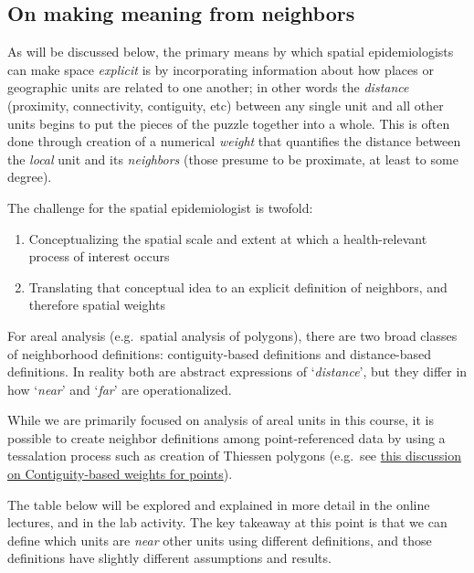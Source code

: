 \documentclass[
]{book}
\providecommand{\tightlist}{%
  \setlength{\itemsep}{0pt}\setlength{\parskip}{0pt}}
\newenvironment{rmdcaution}[1]
  {
  \begin{itemize}
  \renewcommand{\labelitemi}{
    \raisebox{-.7\height}[0pt][0pt]{
      {\setkeys{Gin}{width=3em,keepaspectratio}\texttt{[image: images/\#1]}}
    }
  }
  \setlength{\fboxsep}{1em}
  \begin{caution}
  \item
  }
  {
  \end{caution}
  \end{itemize}
  }
\begin{document}
\hypertarget{on-making-meaning-from-neighbors}{%
\subsection{On making meaning from neighbors}\label{on-making-meaning-from-neighbors}}

As will be discussed below, the primary means by which spatial epidemiologists can make space \emph{explicit} is by incorporating information about how places or geographic units are related to one another; in other words the \emph{distance} (proximity, connectivity, contiguity, etc) between any single unit and all other units begins to put the pieces of the puzzle together into a whole. This is often done through creation of a numerical \emph{weight} that quantifies the distance between the \emph{local} unit and its \emph{neighbors} (those presume to be proximate, at least to some degree).

The challenge for the spatial epidemiologist is twofold:

\begin{enumerate}
\def\labelenumi{\arabic{enumi}.}
\tightlist
\item
  Conceptualizing the spatial scale and extent at which a health-relevant process of interest occurs
\item
  Translating that conceptual idea to an explicit definition of neighbors, and therefore spatial weights
\end{enumerate}

For areal analysis (e.g.~spatial analysis of polygons), there are two broad classes of neighborhood definitions: contiguity-based definitions and distance-based definitions. In reality both are abstract expressions of `\emph{distance}', but they differ in how `\emph{near}' and `\emph{far}' are operationalized.

While we are primarily focused on analysis of areal units in this course, it is possible to create neighbor definitions among point-referenced data by using a tessalation process such as creation of Thiessen polygons (e.g.~see \href{https://geodacenter.github.io/workbook/4b_dist_weights/lab4b.html\#distance-metric}{this discussion on Contiguity-based weights for points}).

\begin{rmdcaution}{caution}
The table below will be explored and explained in more detail in the online lectures, and in the lab activity. The key takeaway at this point is that we can define which units are \emph{near} other units using different definitions, and those definitions have slightly different assumptions and results.

\end{rmdcaution}
\end{document}
